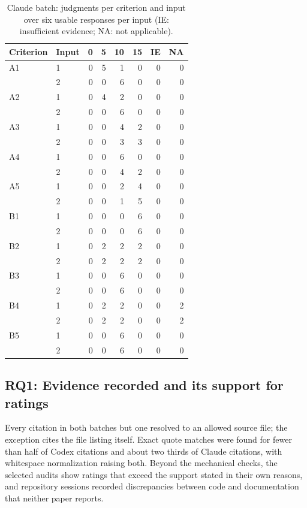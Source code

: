 \documentclass[10pt,conference]{IEEEtran}
\begin{document}
\begin{table}[t]
\caption{Claude batch: judgments per criterion and input over six usable responses per input (IE: insufficient evidence; NA: not applicable).}
\label{tab:ratings-claude}
\centering\small\begin{tabular}{llrrrrrr}\toprule
Criterion & Input & 0 & 5 & 10 & 15 & IE & NA \\
\midrule
A1 & 1 & 0 & 5 & 1 & 0 & 0 & 0 \\
 & 2 & 0 & 0 & 6 & 0 & 0 & 0 \\
A2 & 1 & 0 & 4 & 2 & 0 & 0 & 0 \\
 & 2 & 0 & 0 & 6 & 0 & 0 & 0 \\
A3 & 1 & 0 & 0 & 4 & 2 & 0 & 0 \\
 & 2 & 0 & 0 & 3 & 3 & 0 & 0 \\
A4 & 1 & 0 & 0 & 6 & 0 & 0 & 0 \\
 & 2 & 0 & 0 & 4 & 2 & 0 & 0 \\
A5 & 1 & 0 & 0 & 2 & 4 & 0 & 0 \\
 & 2 & 0 & 0 & 1 & 5 & 0 & 0 \\
B1 & 1 & 0 & 0 & 0 & 6 & 0 & 0 \\
 & 2 & 0 & 0 & 0 & 6 & 0 & 0 \\
B2 & 1 & 0 & 2 & 2 & 2 & 0 & 0 \\
 & 2 & 0 & 2 & 2 & 2 & 0 & 0 \\
B3 & 1 & 0 & 0 & 6 & 0 & 0 & 0 \\
 & 2 & 0 & 0 & 6 & 0 & 0 & 0 \\
B4 & 1 & 0 & 2 & 2 & 0 & 0 & 2 \\
 & 2 & 0 & 2 & 2 & 0 & 0 & 2 \\
B5 & 1 & 0 & 0 & 6 & 0 & 0 & 0 \\
 & 2 & 0 & 0 & 6 & 0 & 0 & 0 \\
\bottomrule\end{tabular}
\end{table}

\subsection{RQ1: Evidence recorded and its support for ratings}
Every citation in both batches but one resolved to an allowed source file; the exception cites the file listing itself. Exact quote matches were found for fewer than half of Codex citations and about two thirds of Claude citations, with whitespace normalization raising both. Beyond the mechanical checks, the selected audits show ratings that exceed the support stated in their own reasons, and repository sessions recorded discrepancies between code and documentation that neither paper reports.
\end{document}
